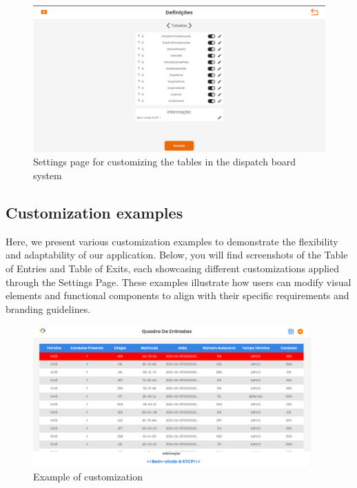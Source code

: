 \documentclass[10pt]{article}
\begin{document}
        \begin{figure}[htbp]
            \centering
            \includegraphics[width=1\textwidth]{tabelas}
            \caption{Settings page for customizing the tables in the dispatch board system}
            \label{fig:settings_tables}
        \end{figure}

        \subsection{Customization examples}

        Here, we present various customization examples to demonstrate the flexibility and adaptability of our application. Below, you will find screenshots of the Table of Entries and Table of Exits, each showcasing different customizations applied through the Settings Page. These examples illustrate how users can modify visual elements and functional components to align with their specific requirements and branding guidelines.
        \vfill
        \begin{figure}[H]
            \centering
            \includegraphics[width=0.95\textwidth]{table_of_entries_stcp1}
            \caption{Example of customization}
            \label{fig:table_of_exits_stcp1}
        \end{figure}
\end{document}
